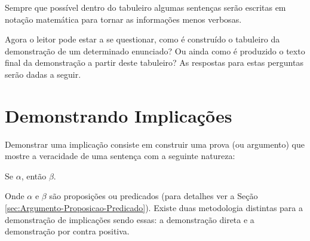 \begin{remark}
    Sempre que possível dentro do tabuleiro algumas sentenças serão escritas em notação matemática para tornar as informações menos verbosas.
\end{remark}

Agora o leitor pode estar a se questionar, como é construído o tabuleiro da demonstração de um determinado enunciado? Ou ainda como é produzido o texto final da demonstração a partir deste tabuleiro? As respostas para estas perguntas serão dadas a seguir. 

\section{Demonstrando Implicações}\label{sec:ProvandoImplicacao}

Demonstrar uma implicação consiste em construir uma prova (ou argumento) que mostre a veracidade de uma sentença com a seguinte natureza: 

\begin{center}
	Se $\alpha$, então $\beta$. 
\end{center}

Onde $\alpha$ e $\beta$ são proposições ou predicados (para detalhes ver a Seção \ref{sec:Argumento-Proposicao-Predicado}). Existe duas metodologia distintas para a demonstração de implicações sendo essas: a demonstração direta e a demonstração por contra positiva.